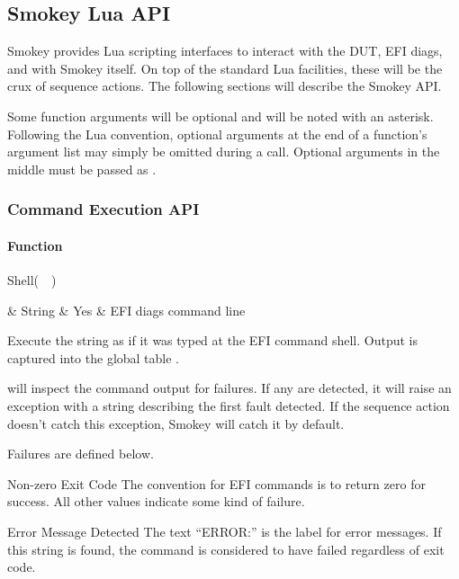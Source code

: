 \subsection{Smokey Lua API}
\label{sec:SmokeyApi}

Smokey provides Lua scripting interfaces to interact with the DUT, EFI diags,
and with Smokey itself.  On top of the standard Lua facilities, these will be
the crux of sequence actions.  The following sections will describe the
Smokey API.

Some function arguments will be optional and will be noted with an asterisk.
Following the Lua convention, optional arguments at the end of a function's
argument list may simply be omitted during a call.  Optional arguments in the
middle must be passed as .

\subsubsection{Command Execution API}

\paragraph{ Function}

\begin{minipage}{\linewidth}
\begin{SmokeyApi}
Shell(~~)
\end{SmokeyApi}

\begin{ApiTable}
	 & String & Yes  & EFI diags command line \\
\end{ApiTable}
\end{minipage}

Execute the string  as if it was typed at the EFI command
shell.  Output is captured into the global table .

 will inspect the command output for failures.  If any are
detected, it will raise an exception with a string describing the first fault
detected.  If the sequence action doesn't catch this exception, Smokey will
catch it by default.

Failures are defined below.

\begin{Descriptive}

	\item[Non-zero Exit Code] The convention for EFI commands is to return
	zero for success.  All other values indicate some kind of failure.

	\item[Error Message Detected]  The text ``ERROR:'' is the label for
	error messages.  If this string is found, the command is considered to
	have failed regardless of exit code.

\end{Descriptive}

